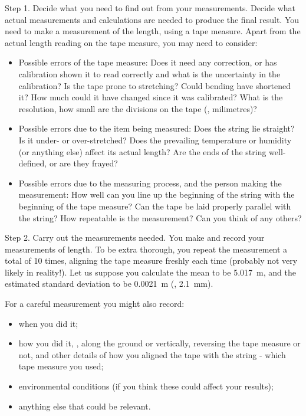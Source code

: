 Step 1. Decide what you need to find out from your measurements. Decide what actual measurements and calculations are needed to produce the final result. You need to make a measurement of the length, using a tape measure. Apart from the actual length reading on the tape measure, you may need to consider:
\begin{itemize}
\item Possible errors of the tape measure: Does it need any correction, or has calibration shown it to read correctly  and what is the uncertainty in the calibration? Is the tape prone to stretching? Could bending have shortened it? How much could it have changed since it was calibrated? What is the resolution, \ie how small are the divisions on the tape (\eg, milimetres)?
%
\item Possible errors due to the item being measured: Does the string lie straight? Is it under- or over-stretched? Does the prevailing temperature or humidity (or anything else) affect its actual length? Are the ends of the string well-defined, or are they frayed?
%
\item Possible errors due to the measuring process, and the person making the measurement: How well can you line up the beginning of the string with the beginning of the tape measure? Can the tape be laid properly parallel with the string? How repeatable is the measurement? Can you think of any others?
\end{itemize}

Step 2. Carry out the measurements needed. You make and record your measurements of length. To be extra thorough, you repeat the measurement a total of 10 times, aligning the tape measure freshly each time (probably not very likely in reality!). Let us suppose you calculate the mean to be \SI{5.017}{m}, and the estimated standard deviation to be \SI{0.0021}{m} (\ie, \SI{2.1}{mm}).

For a careful measurement you might also record:
\begin{itemize}
\item when you did it;
\item how you did it, \eg, along the ground or vertically, reversing the tape measure or not, and other details of how you aligned the tape with the string - which tape measure you used;
\item environmental conditions (if you think these could affect your results);
\item anything else that could be relevant.
\end{itemize}

